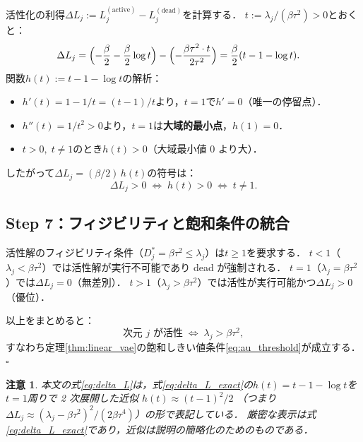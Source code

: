 \documentclass[11pt,a4paper]{jsarticle}
\newtheorem{remark}{注意}
\begin{document}
活性化の利得$\Delta L_j := L_j^{(\mathrm{active})} - L_j^{(\mathrm{dead})}$を計算する．
$t := \lambda_j / (\beta\tau^2) > 0$とおくと：
\begin{align}
  \Delta L_j
  &= \Bigl(-\frac{\beta}{2} - \frac{\beta}{2}\log t\Bigr) - \Bigl(-\frac{\beta\tau^2 \cdot t}{2\tau^2}\Bigr)
   = \frac{\beta}{2}(t - 1 - \log t).
  \label{eq:delta_L_exact}
\end{align}
関数$h(t) := t - 1 - \log t$の解析：
\begin{itemize}
  \item $h'(t) = 1 - 1/t = (t-1)/t$より，$t=1$で$h'=0$（唯一の停留点）．
  \item $h''(t) = 1/t^2 > 0$より，$t=1$は\textbf{大域的最小点}，$h(1) = 0$．
  \item $t > 0,\; t \neq 1$のとき$h(t) > 0$（大域最小値 0 より大）．
\end{itemize}
したがって$\Delta L_j = (\beta/2)\,h(t)$の符号は：
\begin{equation}
  \Delta L_j > 0
  \;\Longleftrightarrow\;
  h(t) > 0
  \;\Longleftrightarrow\;
  t \neq 1.
  \label{eq:delta_sign}
\end{equation}

\subsection*{Step 7：フィジビリティと飽和条件の統合}

活性解のフィジビリティ条件（$D_j^* = \beta\tau^2 \leq \lambda_j$）は$t \geq 1$を要求する．
$t < 1$（$\lambda_j < \beta\tau^2$）では活性解が実行不可能であり dead が強制される．
$t = 1$（$\lambda_j = \beta\tau^2$）では$\Delta L_j = 0$（無差別）．
$t > 1$（$\lambda_j > \beta\tau^2$）では活性が実行可能かつ$\Delta L_j > 0$（優位）．

以上をまとめると：
\begin{equation}
  \text{次元 }j\text{ が活性} \;\Longleftrightarrow\; \lambda_j > \beta\tau^2,
\end{equation}
すなわち定理\ref{thm:linear_vae}の飽和しきい値条件\eqref{eq:au_threshold}が成立する．\hfill$\square$

\begin{remark}
本文の式\eqref{eq:delta_L}は，式\eqref{eq:delta_L_exact}の$h(t) = t - 1 - \log t$を
$t = 1$周りで 2 次展開した近似
$h(t) \approx (t-1)^2/2$
（つまり$\Delta L_j \approx (\lambda_j - \beta\tau^2)^2/(2\beta\tau^4)$）の形で表記している．
厳密な表示は式\eqref{eq:delta_L_exact}であり，近似は説明の簡略化のためのものである．
\end{remark}
\end{document}
